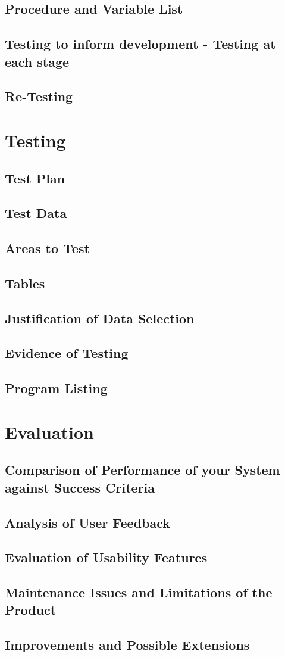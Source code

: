 \documentclass[11pt]{article}
\begin{document}
        \subsection{Procedure and Variable List}
        \subsection{Testing to inform development - Testing at each stage}
        \subsection{Re-Testing}

    \section{Testing}
        \subsection{Test Plan}
        \subsection{Test Data}
        \subsection{Areas to Test}
        \subsection{Tables}
        \subsection{Justification of Data Selection}
        \subsection{Evidence of Testing}
        \subsection{Program Listing}
    
    \section{Evaluation}
        \subsection{Comparison of Performance of your System against Success Criteria}
        \subsection{Analysis of User Feedback}
        \subsection{Evaluation of Usability Features}
        \subsection{Maintenance Issues and Limitations of the Product}
        \subsection{Improvements and Possible Extensions}
        
\end{document}
